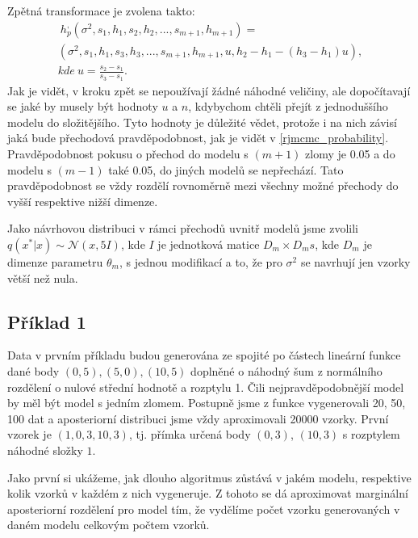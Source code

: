 \documentclass[czech,master,public,dept470,male,cpdeclaration,oneside, python]{diploma}
\begin{document}
Zpětná transformace je zvolena takto:
\begin{align*}
\	h_p^{,}(\sigma^2, s_1, h_1, s_2, h_2, ..., s_{m+1}, h_{m+1}) = \\
(\sigma^2, s_1, h_1, s_3, h_3, ..., s_{m+1}, h_{m+1}, u, h_2 - h_1 - (h_3 - h_1)u), \\ 
kde\ u = \frac{s_2 - s_1}{s_3 - s_1}.
\end{align*}
Jak je vidět, v kroku zpět se nepoužívají žádné náhodné veličiny, ale dopočítavají se jaké by musely být hodnoty $u$ a $n$, kdybychom chtěli přejít z jednoduššího modelu do složitějšího. Tyto hodnoty je důležité vědet, protože i na nich závisí jaká bude přechodová pravděpodobnost, jak je vidět v \eqref{rjmcmc_probability}. Pravděpodobnost pokusu o přechod do modelu s $(m+1)$ zlomy je 0.05 a do modelu s $(m-1)$ také 0.05, do jiných modelů se nepřechází. Tato pravděpodobnost se vždy rozdělí rovnoměrně mezi všechny možné přechody do vyšší respektive nižší dimenze.  \par
Jako návrhovou distribuci v rámci přechodů uvnitř modelů jsme zvolili $q(x^* | x) \sim \mathcal{N}(x, 5I)$, kde $I$ je jednotková matice $D_m \times D_ms$, kde $D_m$ je dimenze parametru $\theta_m$, s jednou modifikací a to, že pro $\sigma^2$ se navrhují jen vzorky větší než nula.

\subsection{Příklad 1}
Data v prvním příkladu budou generována ze spojité po částech lineární funkce dané body $(0, 5), (5, 0), (10, 5)$ doplněné o náhodný šum z normálního rozdělení o nulové střední hodnotě a rozptylu 1. Čili nejpravděpodobnější model by měl být model s jedním zlomem. Postupně jsme z funkce vygenerovali 20, 50, 100 dat a aposteriorní distribuci jsme vždy aproximovali 20000 vzorky. První vzorek je $(1, 0, 3, 10, 3)$, tj. přímka určená body $(0, 3)$, $(10, 3)$ s rozptylem náhodné složky $1$. \par
Jako první si ukážeme, jak dlouho algoritmus zůstává v jakém modelu, respektive kolik vzorků v každém z nich vygeneruje. Z tohoto se dá aproximovat marginální aposteriorní rozdělení pro model tím, že vydělíme počet vzorku generovaných v daném modelu celkovým počtem vzorků.
\end{document}
